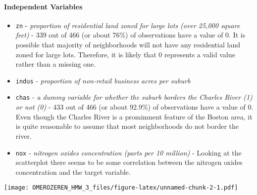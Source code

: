 \documentclass[]{article}
\providecommand{\tightlist}{%
  \setlength{\itemsep}{0pt}\setlength{\parskip}{0pt}}
\let\oldparagraph\paragraph
\renewcommand{\paragraph}[1]{\oldparagraph{#1}\mbox{}}
\begin{document}
\hypertarget{independent-variables}{%
\paragraph{Independent Variables}\label{independent-variables}}

\begin{itemize}
\tightlist
\item
  \texttt{zn} - \emph{proportion of residential land zoned for large
  lots (over 25,000 square feet)} - 339 out of 466 (or about 76\%) of
  observations have a value of 0. It is possible that majority of
  neighborhoods will not have any residential land zoned for large lots.
  Therefore, it is likely that 0 represents a valid value rather than a
  missing one.
\item
  \texttt{indus} - \emph{proportion of non-retail business acres per
  suburb}
\item
  \texttt{chas} - \emph{a dummy variable for whether the suburb borders
  the Charles River (1) or not (0)} - 433 out of 466 (or about 92.9\%)
  of observations have a value of 0. Even though the Charles River is a
  promimnent feature of the Boston area, it is quite reasonable to
  assume that most neighborhoods do not border the river.
\item
  \texttt{nox} - \emph{nitrogen oxides concentration (parts per 10
  million)} - Looking at the scatterplot there seems to be some
  correlation between the nitrogen oxides concentration and the target
  variable.
\end{itemize}

\texttt{[image: OMEROZEREN\_HMW\_3\_files/figure-latex/unnamed-chunk-2-1.pdf]}
\end{document}
